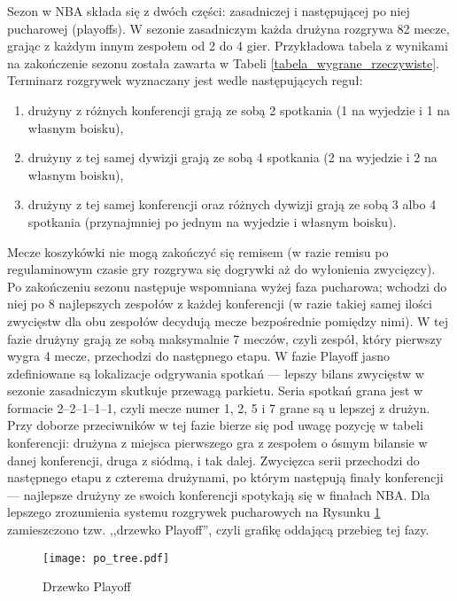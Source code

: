 \documentclass[inzynierska]{pwr_wmat_praca_dyplomowa}
\theoremstyle{plain}
\numberwithin{theorem}{chapter}
\theoremstyle{definition}
\numberwithin{theorem}{chapter}
\begin{document}
Sezon w NBA składa się z dwóch części: zasadniczej i następującej po niej pucharowej (playoffs). W sezonie zasadniczym każda drużyna rozgrywa 82 mecze, grając z każdym innym zespołem od 2 do 4 gier. Przykładowa tabela z wynikami na zakończenie sezonu została zawarta w Tabeli \ref{tabela_wygrane_rzeczywiste}. Terminarz rozgrywek wyznaczany jest wedle następujących reguł:
\begin{enumerate}
	\item drużyny z różnych konferencji grają ze sobą 2 spotkania (1 na wyjedzie i 1 na własnym boisku),
	\item drużyny z tej samej dywizji grają ze sobą 4 spotkania (2 na wyjedzie i 2 na własnym boisku),
	\item drużyny z tej samej konferencji oraz różnych dywizji grają ze sobą 3 albo 4 spotkania (przynajmniej po jednym na wyjedzie i własnym boisku).
\end{enumerate}
Mecze koszykówki nie mogą zakończyć się remisem (w razie remisu po regulaminowym czasie gry rozgrywa się dogrywki aż do wyłonienia zwycięzcy).
Po zakończeniu sezonu następuje wspomniana wyżej faza pucharowa; wchodzi do niej po 8 najlepszych zespołów z każdej konferencji (w razie takiej samej ilości zwycięstw dla obu zespołów decydują mecze bezpośrednie pomiędzy nimi). W tej fazie drużyny grają ze sobą maksymalnie 7 meczów, czyli zespół, który pierwszy wygra 4 mecze, przechodzi do następnego etapu. W fazie Playoff jasno zdefiniowane są lokalizacje odgrywania spotkań --- lepszy bilans zwycięstw w sezonie zasadniczym skutkuje przewagą parkietu. Seria spotkań grana jest w formacie 2–2–1–1–1, czyli mecze numer 1, 2, 5 i 7 grane są u lepszej z drużyn. Przy doborze przeciwników w tej fazie bierze się pod uwagę pozycję w tabeli konferencji: drużyna z miejsca pierwszego gra z zespołem o ósmym bilansie w danej konferencji, druga z siódmą, i tak dalej. Zwycięzca serii przechodzi do następnego etapu z czterema drużynami, po którym następują finały konferencji --- najlepsze drużyny ze swoich konferencji spotykają się w finałach NBA. Dla lepszego zrozumienia systemu rozgrywek pucharowych na Rysunku \ref{po_tree} zamieszczono tzw. ,,drzewko Playoff'', czyli grafikę oddającą przebieg tej fazy.
\begin{figure}[t]
	\texttt{[image: po\_tree.pdf]}
	\caption{Drzewko Playoff}\label{po_tree}
	\centering
\end{figure}
\end{document}
